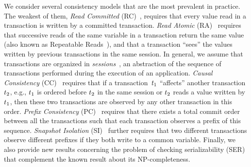 %
%
%
%
We consider several consistency models that are the most prevalent in practice. The weakest of them, \emph{Read Committed} (RC)~\cite{DBLP:conf/sigmod/BerensonBGMOO95}, requires that every value read in a transaction is written by a committed transaction. \emph{Read Atomic} (RA)~\cite{DBLP:conf/concur/Cerone0G15} requires that successive reads of the same variable in a transaction return the same value (also known as Repeatable Reads~\cite{DBLP:conf/sigmod/BerensonBGMOO95}), and that a transaction ``sees'' the values written by previous transactions in the same session. In general, we assume that transactions are organized in \emph{sessions}~\cite{DBLP:conf/pdis/TerryDPSTW94}, an abstraction of the sequence of transactions performed during the execution of an application.
\emph{Causal Consistency} (CC)~\cite{DBLP:journals/cacm/Lamport78} requires that if a transaction~${t}_1$ ``affects'' another transaction ${t}_2$, e.g., ${t}_1$ is ordered before ${t}_2$ in the same session or ${t}_2$ reads a value written by ${t}_1$, then these two transactions are observed by any other transaction in this order. \emph{Prefix Consistency} (PC)~\cite{DBLP:conf/ecoop/BurckhardtLPF15} requires that there exists a total commit order between all the transactions such that each transaction observes a prefix of this sequence. \emph{Snapshot Isolation} (SI)~\cite{DBLP:conf/sigmod/BerensonBGMOO95} further requires that two different transactions observe different prefixes if they both write to a common variable.
Finally, we also provide new results concerning the problem of checking serializability (SER) that complement the known result about its NP-completeness. 

